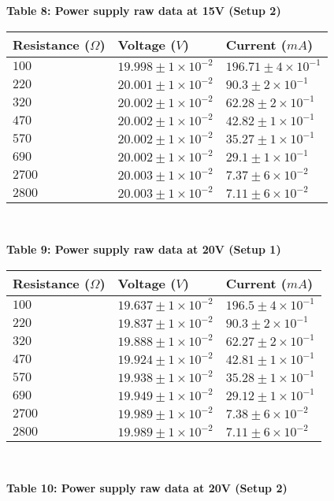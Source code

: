 \begin{center}
    {\textbf{Table 8: Power supply raw data at 15V (Setup 2)} }
\end{center}
\vspace{10pt}
\begin{tabular}{| p{} | p{} | p{} |}
    \hline
    Resistance ($\Omega$) & Voltage ($V$) & Current ($mA$)\\
    \hline 
    $100$ & $19.998 \pm 1\times10^{-2}$ & $196.71 \pm 4\times10^{-1}$\\
    $220$ & $20.001 \pm 1\times10^{-2}$ & $90.3 \pm 2\times10^{-1}$\\
    $320$ & $20.002 \pm 1\times10^{-2}$ & $62.28 \pm 2\times10^{-1}$\\
    $470$ & $20.002 \pm 1\times10^{-2}$ & $42.82 \pm 1\times10^{-1}$\\
    $570$ & $20.002 \pm 1\times10^{-2}$ & $35.27 \pm 1\times10^{-1}$\\
    $690$ & $20.002 \pm 1\times10^{-2}$ & $29.1 \pm 1\times10^{-1}$\\
    $2700$ & $20.003 \pm 1\times10^{-2}$ & $7.37 \pm 6\times10^{-2}$\\
    $2800$ & $20.003 \pm 1\times10^{-2}$ & $7.11 \pm 6\times10^{-2}$\\
    \hline 
 \end{tabular}\\

\begin{center}
    {\textbf{Table 9: Power supply raw data at 20V (Setup 1)} }
\end{center}
\vspace{10pt}
\newpage

\begin{tabular}{| p{} | p{} | p{} |}
    \hline
    Resistance ($\Omega$) & Voltage ($V$) & Current ($mA$)\\
    \hline 
    $100$ & $19.637 \pm 1\times10^{-2}$ & $196.5 \pm 4\times10^{-1}$\\
    $220$ & $19.837 \pm 1\times10^{-2}$ & $90.3 \pm 2\times10^{-1}$\\
    $320$ & $19.888 \pm 1\times10^{-2}$ & $62.27 \pm 2\times10^{-1}$\\
    $470$ & $19.924 \pm 1\times10^{-2}$ & $42.81 \pm 1\times10^{-1}$\\
    $570$ & $19.938 \pm 1\times10^{-2}$ & $35.28 \pm 1\times10^{-1}$\\
    $690$ & $19.949 \pm 1\times10^{-2}$ & $29.12 \pm 1\times10^{-1}$\\
    $2700$ & $19.989 \pm 1\times10^{-2}$ & $7.38 \pm 6\times10^{-2}$\\
    $2800$ & $19.989 \pm 1\times10^{-2}$ & $7.11 \pm 6\times10^{-2}$\\
    \hline 
 \end{tabular}\\

\begin{center}
    {\textbf{Table 10: Power supply raw data at 20V (Setup 2)} }
\end{center}
\vspace{10pt}
